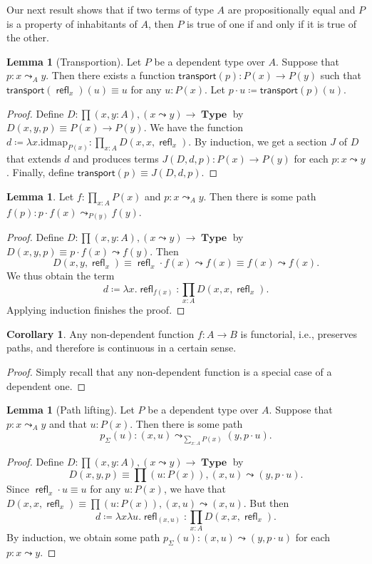 \documentclass[10pt,letterpaper,cm]{nupset}
\theoremstyle{definition}
\theoremstyle{theorem}
\newtheorem{lemma}[definition]{Lemma}
\newtheorem{corollary}[definition]{Corollary}
\theoremstyle{remark}
\newcommand{\1}{\mathbf{1}}
\newcommand{\0}{\vec 0}
\DeclareMathOperator{\refl}{\mathsf{refl}}
\DeclareMathOperator{\type}{\mathbf{Type}}
\begin{document}
Our next result shows that if two terms of type $A$ are propositionally equal and $P$ is a property of inhabitants of $A$, then $P$ is true of one if and only if it is true of the other.

\begin{lemma}[Transportion]
Let $P$ be a dependent type over $A$. Suppose that $p: x\leadsto_A y$. Then there exists a function $\mathsf{transport}(p) : P(x) \to P(y)$ such that $\mathsf{transport}(\refl_x)(u) \equiv u$ for any $u: P(x)$. Let $p \cdot u \coloneqq \mathsf{transport}(p)(u)$.
\end{lemma}
\begin{proof}
Define $D: \prod (x,y:A), (x\leadsto y) \to \type$ by  $D(x,y,p) \equiv P(x) \to P(y)$. We have the function $d\coloneqq \lambda x.\text{idmap}_{P(x)} :\prod_{x:A}D(x,x,\refl_x)$. By induction, we get a section $J$ of $D$ that extends $d$ and produces terms $J(D,d,p) :P(x) \to P(y)$ for each $p: x\leadsto y$. Finally, define $\mathsf{transport}(p) \equiv J(D,d,p)$.
\end{proof}

\begin{lemma}
Let $f: \prod_{x:A}P(x)$ and $p: x\leadsto_A y$. Then there is some path $f(p):p \cdot f(x) \leadsto_{P(y)} f(y)$.
\end{lemma}
\begin{proof}
Define $D: \prod (x,y:A), (x\leadsto y) \to \type$ by  $D(x,y,p) \equiv p\cdot f(x) \leadsto f(y)$. Then $$D(x,y,\refl_x) \equiv \refl_x \cdot f(x) \leadsto f(x) \equiv f(x) \leadsto f(x).$$ We thus obtain the term $$ d\coloneqq \lambda x.\refl_{f(x)}: \prod_{x:A}D(x,x,\refl_x).$$ Applying induction finishes the proof.
\end{proof}

\begin{corollary}
Any non-dependent function $f: A \to B$ is functorial, i.e., preserves paths, and therefore is continuous in a certain sense.
\end{corollary}
\begin{proof}
Simply recall that any non-dependent function is a special case of a dependent one.
\end{proof}



\begin{lemma}[Path lifting]
Let $P$ be a dependent type over $A$. Suppose that $p: x\leadsto_A y$ and that $u: P(x)$. Then there is some path $$p_{\Sigma}(u) : (x, u) \leadsto_{\sum_{x:A}P(x)} (y, p\cdot u).$$
\end{lemma}
\begin{proof}
Define $D: \prod (x,y:A), (x\leadsto y) \to \type$ by  $$D(x,y,p) \equiv \prod(u:P(x)), (x,u) \leadsto (y, p\cdot u).$$ Since $\refl_x \cdot u \equiv u$ for any $u: P(x)$, we have that $D(x, x, \refl_x) \equiv \prod (u:P(x)), (x,u) \leadsto (x,u)$. But then $$ d\coloneqq\lambda x\lambda u. \refl_{(x,u)} : \prod_{x:A} D(x,x, \refl_x) .$$ By induction, we obtain some path $p_{\Sigma}(u) : (x,u)\leadsto (y, p \cdot u)$ for each $p: x\leadsto y$.
\end{proof}
\end{document}
